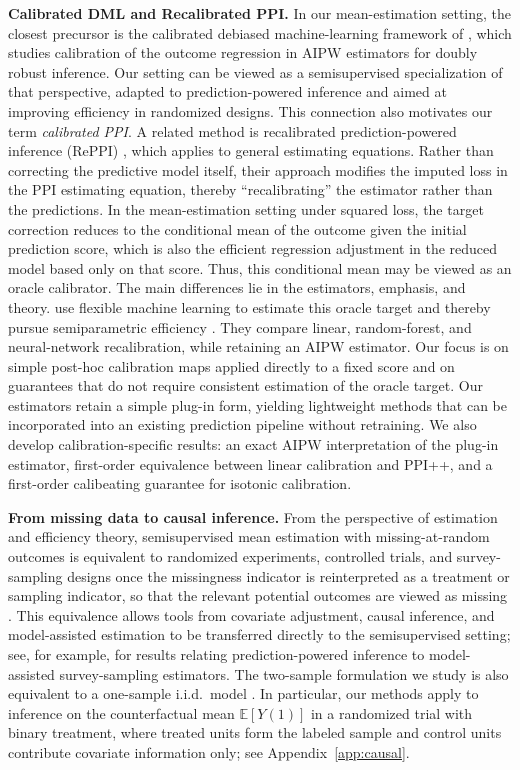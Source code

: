 \documentclass{article}
\theoremstyle{plain}
\theoremstyle{definition}
\newcommand{\1}{\mathbbm{1}}
\begin{document}
\textbf{Calibrated DML and Recalibrated PPI.}
In our mean-estimation setting, the closest precursor is the calibrated debiased machine-learning framework of \citet{van2024automatic}, which studies calibration of the outcome regression in AIPW estimators for doubly robust inference. Our setting can be viewed as a semisupervised specialization of that perspective, adapted to prediction-powered inference and aimed at improving efficiency in randomized designs. This connection also motivates our term \emph{calibrated PPI}. A related method is recalibrated prediction-powered inference (RePPI) \citep{ji2025predictions}, which applies to general estimating equations. Rather than correcting the predictive model itself, their approach modifies the imputed loss in the PPI estimating equation, thereby ``recalibrating” the estimator rather than the predictions. In the mean-estimation setting under squared loss, the target correction reduces to the conditional mean of the outcome given the initial prediction score, which is also the efficient regression adjustment in the reduced model based only on that score. Thus, this conditional mean may be viewed as an oracle calibrator. The main differences lie in the estimators, emphasis, and theory. \citet{ji2025predictions} use flexible machine learning to estimate this oracle target and thereby pursue semiparametric efficiency \citep{robins1994estimation}. They compare linear, random-forest, and neural-network recalibration, while retaining an AIPW estimator. Our focus is on simple post-hoc calibration maps applied directly to a fixed score and on guarantees that do not require consistent estimation of the oracle target. Our estimators retain a simple plug-in form, yielding lightweight methods that can be incorporated into an existing prediction pipeline without retraining. We also develop calibration-specific results: an exact AIPW interpretation of the plug-in estimator, first-order equivalence between linear calibration and PPI++, and a first-order calibeating guarantee for isotonic calibration.

\textbf{From missing data to causal inference.} From the perspective of estimation and efficiency theory, semisupervised mean estimation with missing-at-random outcomes is equivalent to randomized experiments, controlled trials, and survey-sampling designs once the missingness indicator is reinterpreted as a treatment or sampling indicator, so that the relevant potential outcomes are viewed as missing \citep{rubin1978bayesian,vanderlaanunified,licausal,mozer2026ppi}. This equivalence allows tools from covariate adjustment, causal inference, and model-assisted estimation to be transferred directly to the semisupervised setting; see, for example, \citet{mozer2026ppi} for results relating prediction-powered inference to model-assisted survey-sampling estimators. The two-sample formulation we study is also equivalent to a one-sample i.i.d.\ model \citep{li2023efficient}. In particular, our methods apply to inference on the counterfactual mean \(\mathbb{E}[Y(1)]\) in a randomized trial with binary treatment, where treated units form the labeled sample and control units contribute covariate information only; see Appendix~\ref{app:causal}.
\end{document}
